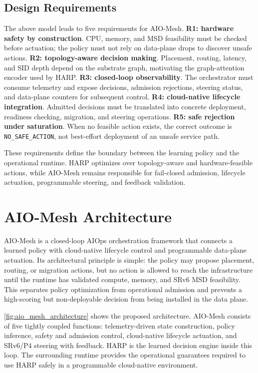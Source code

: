 \documentclass[final,5p]{elsarticle}
\begin{document}
\subsection{Design Requirements}
\label{subsec:design_requirements}

The above model leads to five requirements for AIO-Mesh. \textbf{R1: hardware safety by construction}. CPU, memory, and MSD feasibility must be checked before actuation; the policy must not rely on data-plane drops to discover unsafe actions. \textbf{R2: topology-aware decision making}. Placement, routing, latency, and SID depth depend on the substrate graph, motivating the graph-attention encoder used by HARP. \textbf{R3: closed-loop observability}. The orchestrator must consume telemetry and expose decisions, admission rejections, steering status, and data-plane counters for subsequent control. \textbf{R4: cloud-native lifecycle integration}. Admitted decisions must be translated into concrete deployment, readiness checking, migration, and steering operations. \textbf{R5: safe rejection under saturation}. When no feasible action exists, the correct outcome is \texttt{NO\_SAFE\_ACTION}, not best-effort deployment of an unsafe service path.

These requirements define the boundary between the learning policy and the operational runtime. HARP optimizes over topology-aware and hardware-feasible actions, while AIO-Mesh remains responsible for fail-closed admission, lifecycle actuation, programmable steering, and feedback validation.


\section{AIO-Mesh Architecture}
\label{sec:architecture}

AIO-Mesh is a closed-loop AIOps orchestration framework that connects a learned policy with cloud-native lifecycle control and programmable data-plane actuation. Its architectural principle is simple: the policy may propose placement, routing, or migration actions, but no action is allowed to reach the infrastructure until the runtime has validated compute, memory, and SRv6 MSD feasibility. This separates policy optimization from operational admission and prevents a high-scoring but non-deployable decision from being installed in the data plane.

\autoref{fig:aio_mesh_architecture} shows the proposed architecture. AIO-Mesh consists of five tightly coupled functions: telemetry-driven state construction, policy inference, safety and admission control, cloud-native lifecycle actuation, and SRv6/P4 steering with feedback. HARP is the learned decision engine inside this loop. The surrounding runtime provides the operational guarantees required to use HARP safely in a programmable cloud-native environment.
\end{document}
